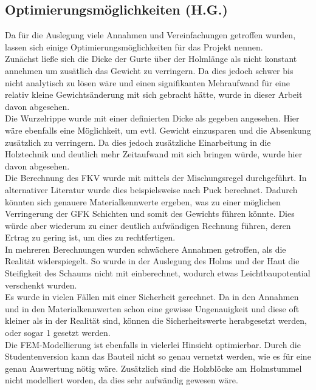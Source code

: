 \subsection{Optimierungsmöglichkeiten (H.G.)}
Da für die Auslegung viele Annahmen und Vereinfachungen getroffen wurden, lassen sich einige Optimierungsmöglichkeiten für das Projekt nennen.\\
\noindent
Zunächst ließe sich die Dicke der Gurte über der Holmlänge als nicht konstant annehmen um zusätlich das Gewicht zu verringern. Da dies jedoch schwer bis nicht analytisch zu lösen wäre und einen signifikanten Mehraufwand für eine relativ kleine Gewichtsänderung mit sich gebracht hätte, wurde in dieser Arbeit davon abgesehen.\\
\noindent
Die Wurzelrippe wurde mit einer definierten Dicke als gegeben angesehen. Hier wäre ebenfalls eine Möglichkeit, um evtl. Gewicht einzusparen und die Absenkung zusätzlich zu verringern. Da dies jedoch zusätzliche Einarbeitung in die Holztechnik und deutlich mehr Zeitaufwand mit sich bringen würde, wurde hier davon abgesehen.\\
\noindent
Die Berechnung des FKV wurde mit mittels der Mischungsregel durchgeführt. In alternativer Literatur wurde dies beispielsweise nach Puck berechnet. Dadurch könnten sich genauere Materialkennwerte ergeben, was zu einer möglichen Verringerung der GFK Schichten und somit des Gewichts führen könnte. Dies würde aber wiederum zu einer deutlich aufwändigen Rechnung führen, deren Ertrag zu gering ist, um dies zu rechtfertigen.\\
\noindent
In mehreren Berechnungen wurden schwächere Annahmen getroffen, als die Realität widerspiegelt. So wurde in der Auslegung des Holms und der Haut die Steifigkeit des Schaums nicht mit einberechnet, wodurch etwas Leichtbaupotential verschenkt wurden.\\
\noindent
Es wurde in vielen Fällen mit einer Sicherheit gerechnet. Da in den Annahmen und in den Materialkennwerten schon eine gewisse Ungenauigkeit und diese oft kleiner als in der Realität sind, können die Sicherheitswerte herabgesetzt werden, oder sogar 1 gesetzt werden.\\
\noindent
Die FEM-Modellierung ist ebenfalls in vielerlei Hinsicht optimierbar. Durch die Studentenversion kann das Bauteil nicht so genau vernetzt werden, wie es für eine genau Auswertung nötig wäre. Zusätzlich sind die Holzblöcke am Holmstummel nicht modelliert worden, da dies sehr aufwändig gewesen wäre.\\
\noindent
 
